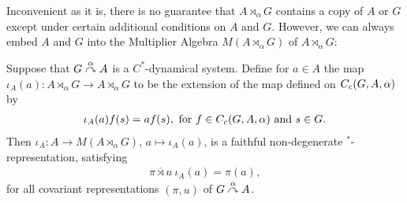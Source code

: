 Inconvenient as it is, there is no guarantee that $A \rtimes_\alpha G$ contains a copy of $A$ or $G$ except under certain additional conditions on $A$ and $G$. However, we can always embed $A$ and $G$ into the Multiplier Algebra $M(A \rtimes_\alpha G)$ of $A \rtimes_\alpha G$:
\begin{lemma}
Suppose that $G \stackrel{\alpha}{\curvearrowright} A$ is a $C^*$-dynamical system. Define for $a \in A$ the map $\iota_A(a) \colon A \rtimes_\alpha G \to A \rtimes_\alpha G$ to be the extension of the map defined on $C_c(G,A,\alpha)$ by
\begin{align*}
	\iota_A(a) f(s) = af(s), \text{ for } f \in C_c(G,A,\alpha) \text{ and } s \in G.
\end{align*}
Then $\iota_A \colon A \to M(A \rtimes_\alpha G)$, $a \mapsto \iota_A(a)$, is a faithful non-degenerate $^*$-representation, satisfying
\begin{align*}
	\overline{\pi \rtimes u } \ \iota_A(a) = \pi(a),
\end{align*}
for all covariant representations $(\pi,u)$ of $G \stackrel{\alpha}{\curvearrowright} A $.
\end{lemma}

